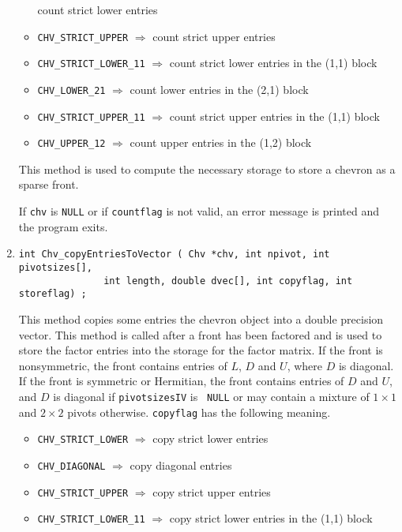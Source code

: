 \begin{enumerate}
\begin{itemize}
      count strict lower entries
\item {\tt CHV\_STRICT\_UPPER} $\Longrightarrow$ 
      count strict upper entries
\item {\tt CHV\_STRICT\_LOWER\_11} $\Longrightarrow$ 
              count strict lower entries in the (1,1) block
\item {\tt CHV\_LOWER\_21} $\Longrightarrow$ 
              count lower entries in the (2,1) block
\item {\tt CHV\_STRICT\_UPPER\_11} $\Longrightarrow$ 
              count strict upper entries in the (1,1) block
\item {\tt CHV\_UPPER\_12} $\Longrightarrow$ 
              count upper entries in the (1,2) block
\end{itemize}
This method is used to compute the necessary storage to store a
chevron as a sparse front.
\par {}
If {\tt chv} is {\tt NULL}
or if {\tt countflag} is not valid,
an error message is printed and the program exits.
\item
\begin{verbatim}
int Chv_copyEntriesToVector ( Chv *chv, int npivot, int pivotsizes[],
               int length, double dvec[], int copyflag, int storeflag) ;
\end{verbatim}
This method copies some entries the chevron object into a double
precision vector.
This method is called after a front has been factored and 
is used to store the factor entries into the
storage for the factor matrix.
If the front is nonsymmetric, the front contains entries
of $L$, $D$ and $U$, where $D$ is diagonal.
If the front is symmetric or Hermitian, the front contains entries
of $D$ and $U$, and $D$ is diagonal if {\tt pivotsizesIV} is {\tt
NULL} or may contain a mixture of $1 \times 1$ and $2 \times 2$
pivots otherwise.
{\tt copyflag} has the following meaning.
\begin{itemize}
\item {\tt CHV\_STRICT\_LOWER} $\Longrightarrow$ 
      copy strict lower entries
\item {\tt CHV\_DIAGONAL} $\Longrightarrow$ copy diagonal entries
\item {\tt CHV\_STRICT\_UPPER} $\Longrightarrow$ 
      copy strict upper entries
\item {\tt CHV\_STRICT\_LOWER\_11} $\Longrightarrow$ 
              copy strict lower entries in the (1,1) block

\end{itemize}
\end{enumerate}
